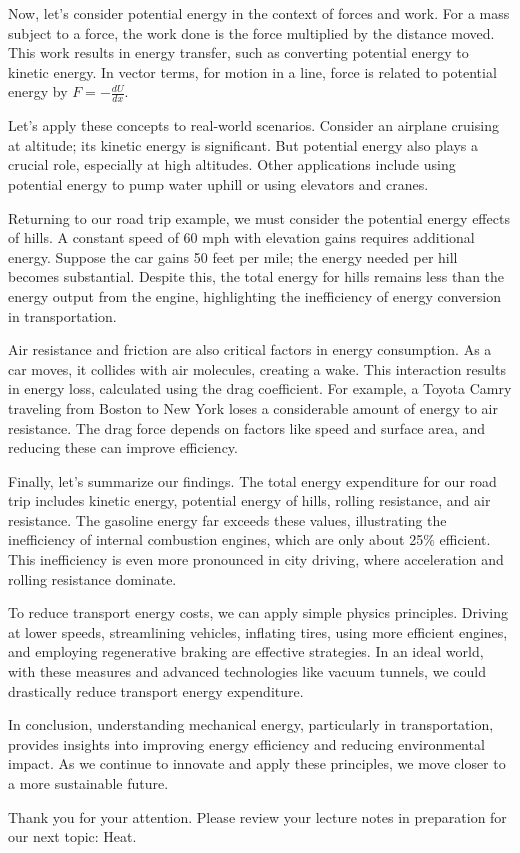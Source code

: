 \begin{tcolorbox}[size=title,opacityfill=0.05,breakable]
Now, let's consider potential energy in the context of forces and work. For a mass subject to a force, the work done is the force multiplied by the distance moved. This work results in energy transfer, such as converting potential energy to kinetic energy. In vector terms, for motion in a line, force is related to potential energy by \( F = -\frac{dU}{dx} \).

Let's apply these concepts to real-world scenarios. Consider an airplane cruising at altitude; its kinetic energy is significant. But potential energy also plays a crucial role, especially at high altitudes. Other applications include using potential energy to pump water uphill or using elevators and cranes.

Returning to our road trip example, we must consider the potential energy effects of hills. A constant speed of 60 mph with elevation gains requires additional energy. Suppose the car gains 50 feet per mile; the energy needed per hill becomes substantial. Despite this, the total energy for hills remains less than the energy output from the engine, highlighting the inefficiency of energy conversion in transportation.

Air resistance and friction are also critical factors in energy consumption. As a car moves, it collides with air molecules, creating a wake. This interaction results in energy loss, calculated using the drag coefficient. For example, a Toyota Camry traveling from Boston to New York loses a considerable amount of energy to air resistance. The drag force depends on factors like speed and surface area, and reducing these can improve efficiency.

Finally, let's summarize our findings. The total energy expenditure for our road trip includes kinetic energy, potential energy of hills, rolling resistance, and air resistance. The gasoline energy far exceeds these values, illustrating the inefficiency of internal combustion engines, which are only about 25\% efficient. This inefficiency is even more pronounced in city driving, where acceleration and rolling resistance dominate.

To reduce transport energy costs, we can apply simple physics principles. Driving at lower speeds, streamlining vehicles, inflating tires, using more efficient engines, and employing regenerative braking are effective strategies. In an ideal world, with these measures and advanced technologies like vacuum tunnels, we could drastically reduce transport energy expenditure.

In conclusion, understanding mechanical energy, particularly in transportation, provides insights into improving energy efficiency and reducing environmental impact. As we continue to innovate and apply these principles, we move closer to a more sustainable future.

Thank you for your attention. Please review your lecture notes in preparation for our next topic: Heat.

\end{tcolorbox}


